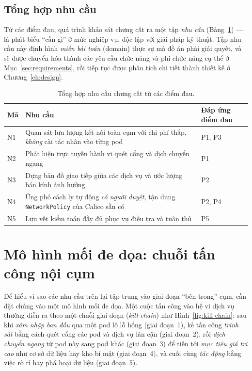 \subsection{Tổng hợp nhu cầu}
\label{subsec:needs}

Từ các điểm đau, quá trình khảo sát chưng cất ra một tập \emph{nhu cầu}
(Bảng~\ref{tab:needs}) --- là phát biểu ``cần gì'' ở mức nghiệp vụ, độc lập với giải pháp
kỹ thuật. Tập nhu cầu này định hình \emph{miền bài toán} (domain) thực sự mà đồ án phải
giải quyết, và sẽ được chuyển hóa thành các yêu cầu chức năng và phi chức năng cụ thể ở
Mục~\ref{sec:requirements}, rồi tiếp tục được phân tích chi tiết thành thiết kế ở
Chương~\ref{ch:design}.

\begin{table}[H]
  \centering
  \caption{Tổng hợp nhu cầu chưng cất từ các điểm đau.}
  \label{tab:needs}
  \small
  \begin{tabularx}{\linewidth}{@{}l X l@{}}
    \toprule
    \textbf{Mã} & \textbf{Nhu cầu} & \textbf{Đáp ứng điểm đau} \\
    \midrule
    N1 & Quan sát lưu lượng kết nối toàn cụm với chi phí thấp, \emph{không} cài tác nhân vào từng pod & P1, P3 \\
    N2 & Phát hiện trực tuyến hành vi quét cổng và dịch chuyển ngang & P1 \\
    N3 & Dựng bản đồ giao tiếp giữa các dịch vụ và ước lượng bán kính ảnh hưởng & P2 \\
    N4 & Ứng phó cách ly tự động \emph{có người duyệt}, tận dụng \texttt{NetworkPolicy} của Calico sẵn có & P2, P4 \\
    N5 & Lưu vết kiểm toán đầy đủ phục vụ điều tra và tuân thủ & P5 \\
    \bottomrule
  \end{tabularx}
\end{table}

\section{Mô hình mối đe dọa: chuỗi tấn công nội cụm}
\label{sec:threat-killchain}

Để hiểu vì sao các nhu cầu trên lại tập trung vào giai đoạn ``bên trong'' cụm, cần đặt
chúng vào một mô hình mối đe dọa. Một cuộc tấn công vào hệ vi dịch vụ thường diễn ra theo
một chuỗi giai đoạn (\textit{kill-chain}) như Hình~\ref{fig:kill-chain}: sau khi
\emph{xâm nhập ban đầu} qua một pod lộ lỗ hổng (giai đoạn~1), kẻ tấn công \emph{trinh sát}
bằng cách quét cổng các pod và dịch vụ lân cận (giai đoạn~2), rồi \emph{dịch chuyển ngang}
từ pod này sang pod khác (giai đoạn~3) để tiến tới \emph{mục tiêu giá trị cao} như cơ sở
dữ liệu hay kho bí mật (giai đoạn~4), và cuối cùng \emph{tác động} bằng việc rò rỉ hay phá
hoại dữ liệu (giai đoạn~5).


